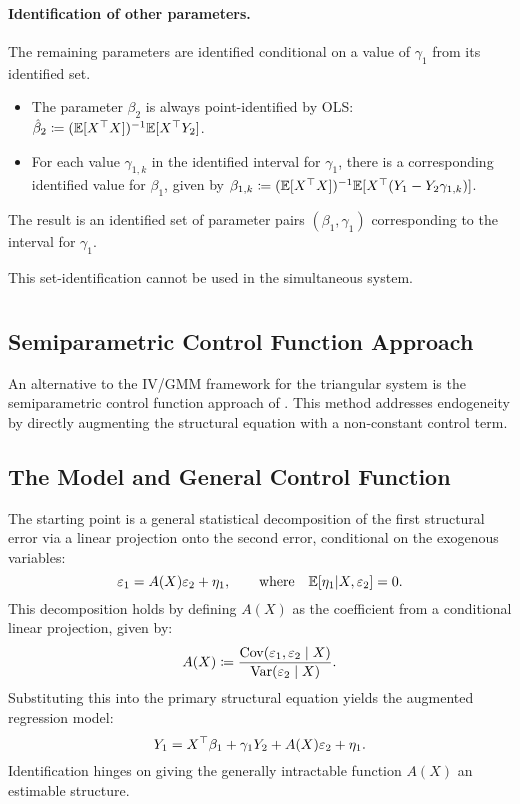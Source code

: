 \paragraph{Identification of other parameters.}

The remaining parameters are identified conditional on a value of
$\gamma_{1}$ from its identified set.
\begin{itemize}
\itemsep0pt
\item The parameter $\beta_{2}$ is always point-identified by OLS: $\hat{\beta}_{2}\coloneqq(\mathbb{E}[X^{\top} X])^{-1}\mathbb{E}[X^{\top} Y_{2}]$.
\item For each value $\gamma_{1,k}$ in the identified interval for $\gamma_{1}$,
there is a corresponding identified value for $\beta_{1}$, given
by $\beta_{1,k}\coloneqq(\mathbb{E}[X^{\top} X])^{-1}\mathbb{E}[X^{\top}(Y_{1}-Y_{2}\gamma_{1,k})]$.
\end{itemize}
The result is an identified set of parameter pairs $(\beta_{1},\gamma_{1})$
corresponding to the interval for $\gamma_{1}$.

This set-identification cannot be used in the simultaneous system.

\section[Klein and Vella (2010)]{\textcite{klein2010estimating}}

\subsection{Semiparametric Control Function Approach}

An alternative to the IV/GMM framework for the triangular system is the semiparametric control function approach of \textcite{klein2010estimating}. This method addresses endogeneity by directly augmenting the structural equation with a non-constant control term.

\subsection{The Model and General Control Function}

The starting point is a general statistical decomposition of the first structural error via a linear projection onto the second error, conditional on the exogenous variables:
\[
\varepsilon_1 = A(X)\varepsilon_2 + \eta_1, \qquad \text{where} \quad \mathbb{E}[\eta_1 | X, \varepsilon_2] = 0.
\]
This decomposition holds by defining $A(X)$ as the coefficient from a conditional linear projection, given by:
\[
A(X) \coloneqq \frac{\operatorname{Cov}(\varepsilon_1, \varepsilon_2 \mid X)}{\operatorname{Var}(\varepsilon_2 \mid X)}.
\]
Substituting this into the primary structural equation yields the augmented regression model:
\begin{equation}
Y_1 = X^{\top}\beta_1 + \gamma_1 Y_2 + A(X)\varepsilon_2 + \eta_1. \label{eq:cf_model}
\end{equation}
Identification hinges on giving the generally intractable function $A(X)$ an estimable structure.

